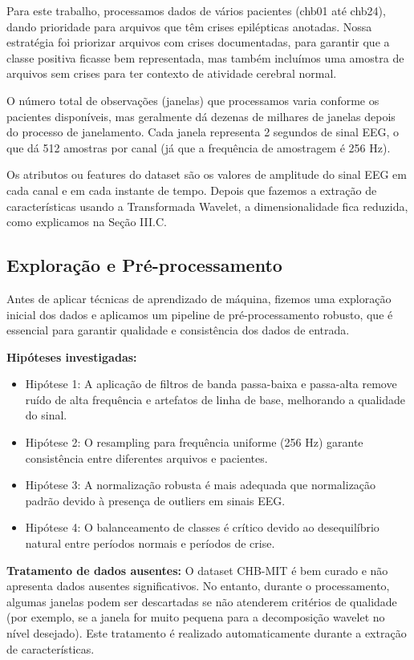 \documentclass[12pt,a4paper]{article}
\begin{document}
Para este trabalho, processamos dados de vários pacientes (chb01 até chb24), dando prioridade para arquivos que têm crises epilépticas anotadas. Nossa estratégia foi priorizar arquivos com crises documentadas, para garantir que a classe positiva ficasse bem representada, mas também incluímos uma amostra de arquivos sem crises para ter contexto de atividade cerebral normal.

O número total de observações (janelas) que processamos varia conforme os pacientes disponíveis, mas geralmente dá dezenas de milhares de janelas depois do processo de janelamento. Cada janela representa 2 segundos de sinal EEG, o que dá 512 amostras por canal (já que a frequência de amostragem é 256 Hz).

Os atributos ou features do dataset são os valores de amplitude do sinal EEG em cada canal e em cada instante de tempo. Depois que fazemos a extração de características usando a Transformada Wavelet, a dimensionalidade fica reduzida, como explicamos na Seção III.C.

\subsection{Exploração e Pré-processamento}

Antes de aplicar técnicas de aprendizado de máquina, fizemos uma exploração inicial dos dados e aplicamos um pipeline de pré-processamento robusto, que é essencial para garantir qualidade e consistência dos dados de entrada.

\textbf{Hipóteses investigadas:}
\begin{itemize}
    \item Hipótese 1: A aplicação de filtros de banda passa-baixa e passa-alta remove ruído de alta frequência e artefatos de linha de base, melhorando a qualidade do sinal.
    \item Hipótese 2: O resampling para frequência uniforme (256 Hz) garante consistência entre diferentes arquivos e pacientes.
    \item Hipótese 3: A normalização robusta é mais adequada que normalização padrão devido à presença de outliers em sinais EEG.
    \item Hipótese 4: O balanceamento de classes é crítico devido ao desequilíbrio natural entre períodos normais e períodos de crise.
\end{itemize}

\textbf{Tratamento de dados ausentes:} O dataset CHB-MIT é bem curado e não apresenta dados ausentes significativos. No entanto, durante o processamento, algumas janelas podem ser descartadas se não atenderem critérios de qualidade (por exemplo, se a janela for muito pequena para a decomposição wavelet no nível desejado). Este tratamento é realizado automaticamente durante a extração de características.
\end{document}

